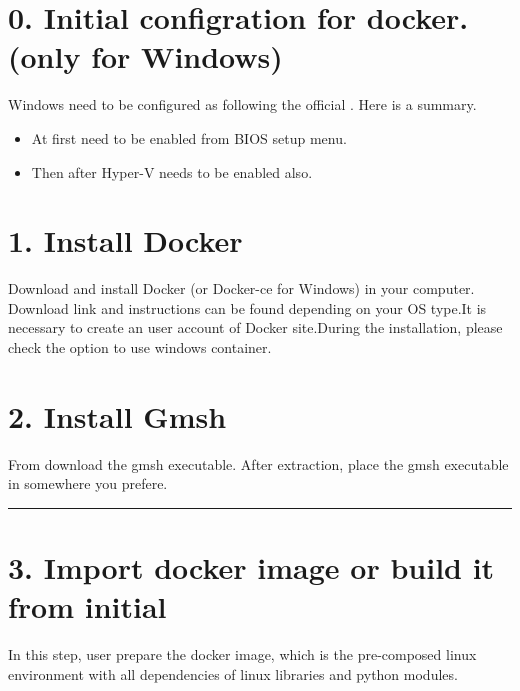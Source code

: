 \documentclass[letterpaper,10pt,english]{sphinxmanual}
\begin{document}
\section{0. Initial configration for docker. (only for Windows)}
\label{\detokenize{installation:initial-configration-for-docker-only-for-windows}}
Windows need to be configured as following the official . Here is a summary.
\begin{itemize}
\item {} 
At first  need to be enabled from BIOS setup menu.

\item {} 
Then after Hyper-V needs to be enabled also.

\end{itemize}




\section{1. Install Docker}
\label{\detokenize{installation:install-docker}}
Download and install Docker (or Docker-ce for Windows) in your computer. Download link and instructions can be found  depending on your OS type.It is necessary to create an user account of Docker site.During the installation, please  check the option to use windows container.


\section{2. Install Gmsh}
\label{\detokenize{installation:install-gmsh}}
From  download the gmsh executable.
After extraction, place the gmsh executable in somewhere you prefere.


\bigskip\hrule\bigskip



\section{3. Import docker image or build it from initial}
\label{\detokenize{installation:import-docker-image-or-build-it-from-initial}}
In this step, user prepare the docker image, which is the pre-composed linux environment with all dependencies of linux libraries and python modules.
\end{document}
